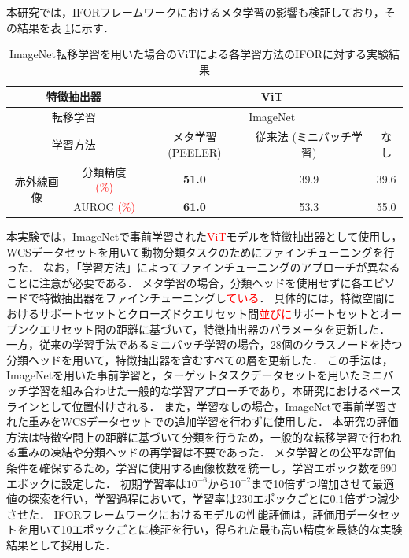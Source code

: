 \documentclass[a4paper,11pt,nomag]{jsreport}
\begin{document}
本研究では，IFORフレームワークにおけるメタ学習の影響も検証しており，その結果を表 \ref{tbl:exp2}に示す．
% 
\begin{table}[tbp]
  \centering
  \caption{ImageNet転移学習を用いた場合のViTによる各学習方法のIFORに対する実験結果}
  \label{tbl:exp2}
  \begin{tabular}{cc||c|c|c}
      \hline
      \multicolumn{2}{c||}{特徴抽出器}          &          \multicolumn{3}{c}{ViT}                \\ \hline
      \multicolumn{2}{c||}{転移学習}            &          \multicolumn{3}{c}{ImageNet}           \\ \hline
      \multicolumn{2}{c||}{学習方法}            & メタ学習 (PEELER)  & 従来法 (ミニバッチ学習) & なし  \\ \hline\hline
      \multirow{2}{*}{赤外線画像} & 分類精度 \textcolor{red}{(\%)} &  \textbf{51.0}   &        39.9          & 39.6  \\
                                & AUROC \textcolor{red}{(\%)}   &  \textbf{61.0}   &        53.3          & 55.0  \\ \hline
  \end{tabular}
\end{table}
% 
本実験では，ImageNetで事前学習された\textcolor{red}{ViT}モデルを特徴抽出器として使用し，WCSデータセットを用いて動物分類タスクのためにファインチューニングを行った．
なお，「学習方法」によってファインチューニングのアプローチが異なることに注意が必要である．
メタ学習の場合，分類ヘッドを使用せずに各エピソードで特徴抽出器をファインチューニングし\textcolor{red}{ている}．
具体的には，特徴空間におけるサポートセットとクローズドクエリセット間\textcolor{red}{並びに}サポートセットとオープンクエリセット間の距離に基づいて，特徴抽出器のパラメータを更新した．
一方，従来の学習手法であるミニバッチ学習の場合，28個のクラスノードを持つ分類ヘッドを用いて，特徴抽出器を含むすべての層を更新した．
この手法は，ImageNetを用いた事前学習と，ターゲットタスクデータセットを用いたミニバッチ学習を組み合わせた一般的な学習アプローチであり，本研究におけるベースラインとして位置付けされる．
また，学習なしの場合，ImageNetで事前学習された重みをWCSデータセットでの追加学習を行わずに使用した．
本研究の評価方法は特徴空間上の距離に基づいて分類を行うため，一般的な転移学習で行われる重みの凍結や分類ヘッドの再学習は不要であった．
メタ学習との公平な評価条件を確保するため，学習に使用する画像枚数を統一し，学習エポック数を690エポックに設定した．
初期学習率は$10^{-6}$から$10^{-2}$まで10倍ずつ増加させて最適値の探索を行い，学習過程において，学習率は230エポックごとに0.1倍ずつ減少させた．
IFORフレームワークにおけるモデルの性能評価は，評価用データセットを用いて10エポックごとに検証を行い，得られた最も高い精度を最終的な実験結果として採用した．
\end{document}
